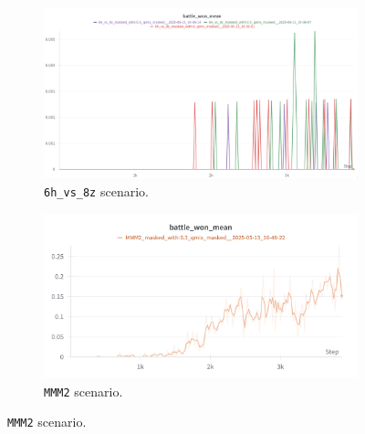 \documentclass[../Main.tex]{subfiles}
\begin{document}
\begin{figure}[H]
    \centering
    \begin{subfigure}[b]{0.48\textwidth}
        \centering
        \includegraphics[width=\linewidth]{img/results/6hvs8z.png}
        \caption{\texttt{6h\_vs\_8z} scenario.}
        \label{fig:6hvs8z}
    \end{subfigure}
    \hfill %
    \begin{subfigure}[b]{0.48\textwidth}
        \centering
        \includegraphics[width=\linewidth]{img/results/MMM2.png}
        \caption{\texttt{MMM2} scenario.}
        \label{fig:mmm2}
    \end{subfigure}
    \vspace{1em} %


\end{figure}
\end{document}
